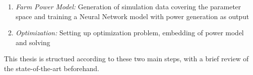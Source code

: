 \begin{enumerate}
	\item \textit{Farm Power Model:} Generation of simulation data covering the parameter space and training a Neural Network model with power generation as output
	\item \textit{Optimization:} Setting up optimization problem, embedding of power model and solving
\end{enumerate}

This thesis is structued according to these two main steps, with a brief review of the state-of-the-art beforehand. 







